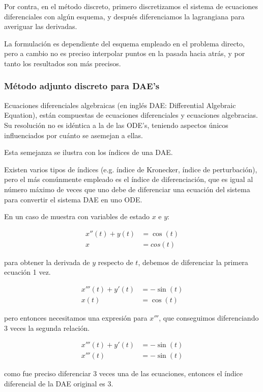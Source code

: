 Por contra, en el método discreto, primero discretizamos el sistema de
ecuaciones diferenciales con algún esquema, y después diferenciamos la
lagrangiana para averiguar las derivadas.

La formulación es dependiente del esquema empleado en el problema directo, pero
a cambio no es preciso interpolar puntos en la pasada hacia atrás, y por tanto
los resultados son más precisos.

\subsubsection{Método adjunto discreto para DAE's}

Ecuaciones diferenciales algebraicas (en inglés DAE: Differential Algebraic
Equation), están compuestas de ecuaciones diferenciales y ecuaciones
algebracias. Su resolución no es idéntica a la de las ODE's, teniendo aspectos
únicos influenciados por cuánto se asemejan a ellas.

Esta semejanza se ilustra con los índices de una DAE.

Existen varios tipos de índices (e.g. índice de Kronecker, índice de perturbación),
pero el más comúnmente empleado es el índice de diferenciación, que es igual
al número máximo de veces que uno debe de diferenciar una ecuación del sistema
para convertir el sistema DAE en uno ODE.

En un caso de muestra con variables de estado $x$ e $y$:

\begin{align} x''(t) + y(t) & = \cos(t) \\
              x             & = cos(t)
\end{align}

para obtener la derivada de $y$ respecto de $t$, debemos de diferenciar la
primera ecuación 1 vez.

\begin{align}
	x'''(t) + y'(t) & = -\sin(t) \\
	x(t)            & = \cos(t)
\end{align}

pero entonces necesitamos una expresión para $x'''$, que conseguimos
diferenciando 3 veces la segunda relación.

\begin{align}
	x'''(t) + y'(t) & = -\sin(t) \\
	x'''(t)         & = -\sin(t)
\end{align}

como fue preciso diferenciar 3 veces una de las ecuaciones, entonces el índice
diferencial de la DAE original es 3.

